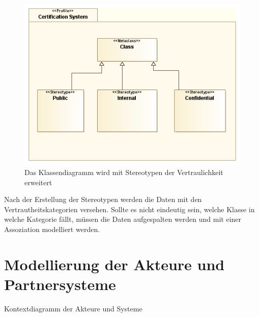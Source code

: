 \begin{figure}[!htbp]
    \centering
    \includegraphics[scale=0.5]{uml/datastereotypes.png}
    \caption{Das Klassendiagramm wird mit Stereotypen der Vertraulichkeit erweitert}
\end{figure}

Nach der Erstellung der Stereotypen werden die Daten mit den Vertrautheitskategorien versehen. Sollte es nicht eindeutig sein, welche Klasse in welche Kategorie fällt, müssen die Daten aufgespalten werden und mit einer Assoziation modelliert werden.


\section{Modellierung der Akteure und Partnersysteme}
Kontextdiagramm der Akteure und Systeme
